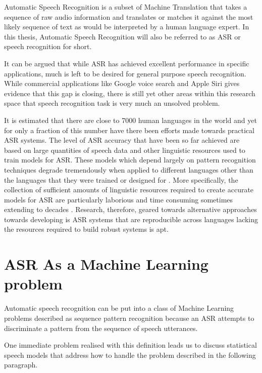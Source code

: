 Automatic Speech Recognition is a subset of Machine Translation that takes a sequence of raw audio information and translates or matches it against the most likely sequence of text as would be interpreted by a human language expert.  In this thesis, Automatic Speech Recognition will also be referred to as 
ASR or speech recognition for short.

It can be argued that while ASR has achieved excellent performance in specific applications, much is left to be desired for general purpose speech recognition. While commercial applications like Google voice search and Apple Siri gives evidence that this gap is closing, there is still yet other areas within this research space that speech recognition task is very much an unsolved problem.

It is estimated that there are close to 7000 human languages in the world \citep{besacier2014automatic} and yet for only a fraction of this number have there been efforts made towards practical ASR systems.  The level of ASR accuracy that have been so far achieved are based on large quantities of speech data and other linguistic resources used to train models for ASR. These models which depend largely on pattern recognition techniques degrade tremendously  when applied to different languages other than the languages that they were trained or designed for  \citep{Rosenberg2017end,besacier2014introduction}. More specifically, the collection of sufficient amounts of linguistic resources required to create accurate models for ASR are particularly laborious and time consuming sometimes extending to decades \citep{goldman2011easyalign,stan2016alisa}.  Research, therefore, geared towards alternative approaches towards developing is ASR systems that are reproducible across languages lacking the resources required to build robust systems is apt.

\section{ASR As a Machine Learning  problem}\label{ASRMLP}
\pagestyle{plain}
Automatic speech recognition can be put into a class of Machine Learning problems described as sequence pattern recognition because an ASR attempts to discriminate a pattern from the sequence of speech utterances. 

One immediate problem realised with this definition leads us to discuss statistical speech models that address how to handle the problem described in the following paragraph.

